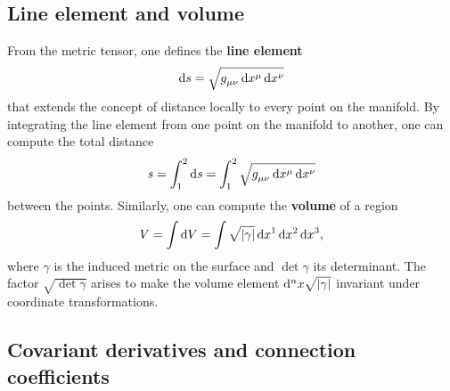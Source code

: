 \subsection{Line element and volume}

From the metric tensor, one defines the \textbf{line element}
\begin{equation}
	\dif s = \sqrt{g\indices{_\mu_\nu} \dif x^\mu \dif x^\nu}
	\label{eq:def_line_elem}
\end{equation} 
that extends the concept of distance locally to every point on the manifold.
By integrating the line element from one point on the manifold to another, one can compute the total distance
\begin{equation}
	s = \int_1^2 \dif s = \int_1^2 \sqrt{g\indices{_\mu_\nu} \dif x^\mu \dif x^\nu}
\end{equation}
between the points.
Similarly, one can compute the \textbf{volume} of a region
\begin{equation}
	V = \int \mathop{}\!\mathrm{d} V = \int \sqrt{\lvert \gamma \rvert} \mathop{}\!\mathrm{d} x^1 \mathop{}\!\mathrm{d} x^2 \mathop{}\!\mathrm{d} x^3 ,
\end{equation}
where $\gamma$ is the induced metric on the surface and $\det{\gamma}$ its determinant.
The factor $\sqrt{\det{\gamma}}$ arises to make the volume element $\mathop{}\!\mathrm{d}^n x \sqrt{\lvert \gamma \rvert}$ invariant under coordinate transformations.

\subsection{Covariant derivatives and connection coefficients}

